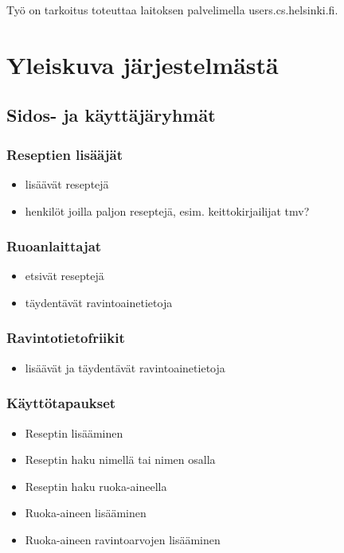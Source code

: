 \documentclass[12pt]{article}
\begin{document}
Työ on tarkoitus toteuttaa laitoksen palvelimella users.cs.helsinki.fi.



\section{Yleiskuva järjestelmästä}

\subsection{Sidos- ja käyttäjäryhmät}

\subsubsection{Reseptien lisääjät}

\begin{itemize}
\item lisäävät reseptejä
\item henkilöt joilla paljon reseptejä, esim. keittokirjailijat tmv?
\end{itemize}


\subsubsection{Ruoanlaittajat}
\begin{itemize}
\item etsivät reseptejä
\item täydentävät ravintoainetietoja
\end{itemize}

\subsubsection{Ravintotietofriikit}

\begin{itemize}
\item lisäävät ja täydentävät ravintoainetietoja
\end{itemize}



\subsubsection{Käyttötapaukset}
\begin{itemize}
\item Reseptin lisääminen
\item Reseptin haku nimellä tai nimen osalla
\item Reseptin haku ruoka-aineella
\item Ruoka-aineen lisääminen
\item Ruoka-aineen ravintoarvojen lisääminen
\end{itemize}
\end{document}
